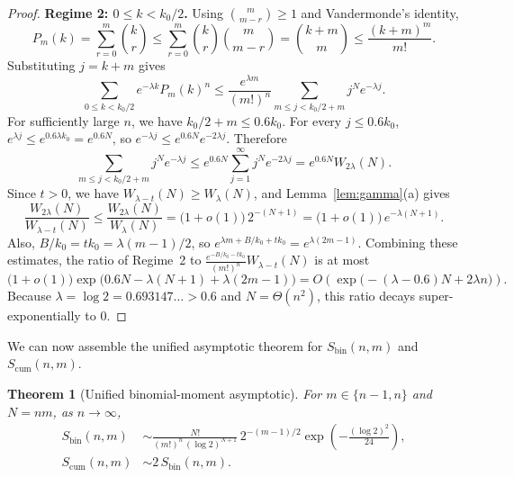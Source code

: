 \documentclass[11pt,a4paper]{article}
\newtheorem{theorem}{Theorem}
\theoremstyle{remark}
\begin{document}
\begin{proof}
\medskip
\noindent\textbf{Regime 2: $0\le k < k_0/2$.}
Using $\binom{m}{m-r}\ge 1$ and Vandermonde's identity,
\[
  P_m(k) = \sum_{r=0}^{m}\binom{k}{r}
  \le \sum_{r=0}^{m}\binom{k}{r}\binom{m}{m-r}
  = \binom{k+m}{m}
  \le \frac{(k+m)^m}{m!}.
\]
Substituting $j = k + m$ gives
\[
  \sum_{0\le k < k_0/2} e^{-\lambda k} P_m(k)^n
  \le \frac{e^{\lambda m}}{(m!)^n} \sum_{m\le j < k_0/2 + m} j^N e^{-\lambda j}.
\]
For sufficiently large $n$, we have $k_0/2 + m \le 0.6 k_0$. For every $j\le 0.6 k_0$, $e^{\lambda j} \le e^{0.6\lambda k_0} = e^{0.6 N}$, so $e^{-\lambda j} \le e^{0.6 N} e^{-2\lambda j}$. Therefore
\[
  \sum_{m\le j < k_0/2 + m} j^N e^{-\lambda j}
  \le e^{0.6 N} \sum_{j=1}^{\infty} j^N e^{-2\lambda j}
  = e^{0.6 N} W_{2\lambda}(N).
\]
Since $t > 0$, we have $W_{\lambda - t}(N) \ge W_\lambda(N)$, and Lemma~\ref{lem:gamma}(a) gives
\[
  \frac{W_{2\lambda}(N)}{W_{\lambda - t}(N)}
  \le \frac{W_{2\lambda}(N)}{W_{\lambda}(N)}
  = \bigl(1 + o(1)\bigr)\,2^{-(N+1)}
  = \bigl(1 + o(1)\bigr)\,e^{-\lambda(N+1)}.
\]
Also, $B/k_0 = t k_0 = \lambda(m-1)/2$, so $e^{\lambda m + B/k_0 + t k_0} = e^{\lambda(2m-1)}$. Combining these estimates, the ratio of Regime~2 to $\frac{e^{-B/k_0 - t k_0}}{(m!)^n} W_{\lambda - t}(N)$ is at most
\[
  \bigl(1 + o(1)\bigr)\exp\!\bigl(0.6 N - \lambda(N+1) + \lambda(2m-1)\bigr)
  = O\!\left(\exp\!\bigl(-(\lambda - 0.6)N + 2\lambda n\bigr)\right).
\]
Because $\lambda = \log 2 = 0.693147\ldots > 0.6$ and $N = \Theta(n^2)$, this ratio decays super-exponentially to $0$.
\end{proof}

We can now assemble the unified asymptotic theorem for $S_{\mathrm{bin}}(n,m)$ and $S_{\mathrm{cum}}(n,m)$.

\begin{theorem}[Unified binomial-moment asymptotic]\label{thm:unified}
For $m\in\{n-1, n\}$ and $N = nm$, as $n\to\infty$,
\begin{align}
  S_{\mathrm{bin}}(n,m)
  &\sim \frac{N!}{(m!)^n\,(\log 2)^{N+1}}\,
        2^{-(m-1)/2}\exp\!\left(-\frac{(\log 2)^2}{24}\right),
        \label{eq:Sbin-asym}\\
  S_{\mathrm{cum}}(n,m)
  &\sim 2\,S_{\mathrm{bin}}(n,m).
        \label{eq:Scum-asym}
\end{align}
\end{theorem}
\end{document}
